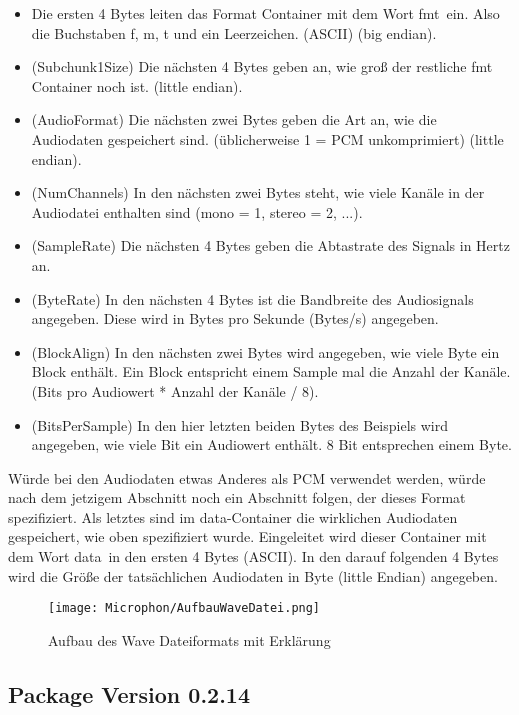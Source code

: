 \begin{itemize}
    \item 
    Die ersten 4 Bytes leiten das Format Container mit dem Wort \grqq fmt\grqq \ ein. Also die Buchstaben f, m, t und ein Leerzeichen.
    (ASCII) (big endian).
    \item (Subchunk1Size) Die nächsten 4 Bytes geben an, wie groß der restliche fmt Container noch ist. (little endian).
    \item (AudioFormat) Die nächsten zwei Bytes geben die Art an, wie die Audiodaten gespeichert sind. (üblicherweise 1 = PCM unkomprimiert) (little endian).
    \item (NumChannels) In den nächsten zwei Bytes steht, wie viele Kanäle in der Audiodatei enthalten sind (mono = 1, stereo = 2, ...).
    \item (SampleRate) Die nächsten 4 Bytes geben die Abtastrate des Signals in Hertz an.
    \item (ByteRate) In den nächsten 4 Bytes ist die Bandbreite des Audiosignals angegeben. Diese wird in Bytes pro Sekunde (Bytes/s) angegeben.
    \item (BlockAlign) In den nächsten zwei Bytes wird angegeben, wie viele Byte ein Block enthält. Ein Block entspricht einem Sample mal die Anzahl der Kanäle. (Bits pro Audiowert * Anzahl der Kanäle / 8).
    \item (BitsPerSample) In den hier letzten beiden Bytes des Beispiels wird angegeben, wie viele Bit ein Audiowert enthält. 8 Bit entsprechen einem Byte.
\end{itemize}

Würde bei den Audiodaten etwas Anderes als PCM verwendet werden, würde nach dem jetzigem
Abschnitt noch ein Abschnitt folgen, der dieses Format spezifiziert.
\newline
Als letztes sind im data-Container die wirklichen Audiodaten gespeichert, wie oben spezifiziert wurde.
Eingeleitet wird dieser Container mit dem Wort \glqq data\grqq~in den ersten 4 Bytes (ASCII). In den darauf folgenden 4 Bytes
wird die Größe der tatsächlichen Audiodaten in Byte (little Endian) angegeben.

\begin{figure}[ht]
    \centering
  \texttt{[image: Microphon/AufbauWaveDatei.png]}
    \caption{Aufbau des Wave
        Dateiformats 
        mit Erklärung \cite{Wilson:2003}}
    \label{fig:AufbauWave}
\end{figure}


\subsection{Package  Version 0.2.14}

